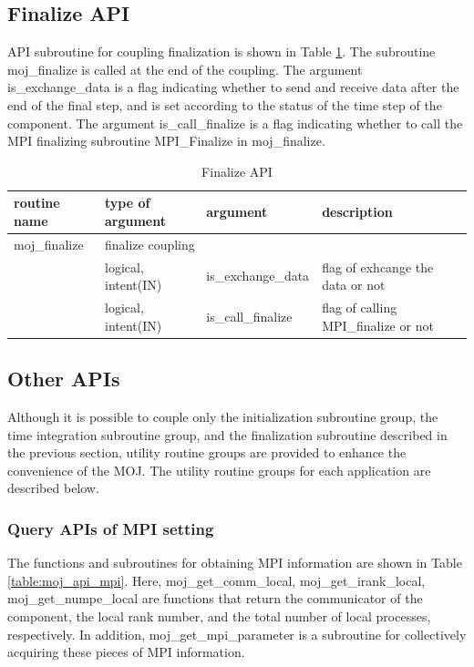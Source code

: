 \documentclass[11pt,a4paper]{report}
\newcommand{\tabref}[1]{Table \ref{#1}}
\begin{document}
\subsection{Finalize API}
API subroutine for coupling finalization is shown in \tabref{table:moj_api_finalize}.
The subroutine moj\_finalize is called at the end of the coupling. The argument is\_exchange\_data is a flag indicating whether to send and receive data after the end of the final step, and is set according to the status of the time step of the component. The argument is\_call\_finalize is a flag indicating whether to call the MPI finalizing subroutine MPI\_Finalize in moj\_finalize.

\begin{table}[H]
\begin{center}
\caption{Finalize API}
{\small
\label{table:moj_api_finalize}
\begin{tabular}{llll}
\hline\hline
routine name & type of argument & argument　& description \\
\hline
 moj\_finalize &  \multicolumn{3}{l}{finalize coupling}\\
           &  logical, intent(IN) &  is\_exchange\_data & flag of exhcange the data or not\\
           &  logical, intent(IN) &  is\_call\_finalize & flag of calling MPI\_finalize or not\\
\hline\hline
\end{tabular}
}
\end{center}
\end{table}

\subsection{Other APIs}
Although it is possible to couple only the initialization subroutine group, the time integration subroutine group, and the finalization subroutine described in the previous section, utility routine groups are provided to enhance the convenience of the MOJ. The utility routine groups for each application are described below.

\subsubsection{Query APIs of MPI setting}
The functions and subroutines for obtaining MPI information are shown in \tabref{table:moj_api_mpi}. Here, 
moj\_get\_comm\_local, moj\_get\_irank\_local, moj\_get\_numpe\_local are functions that return the communicator of the component, the local rank number, and the total number of local processes, respectively. In addition,
moj\_get\_mpi\_parameter is a subroutine for collectively acquiring these pieces of MPI information.
\end{document}
